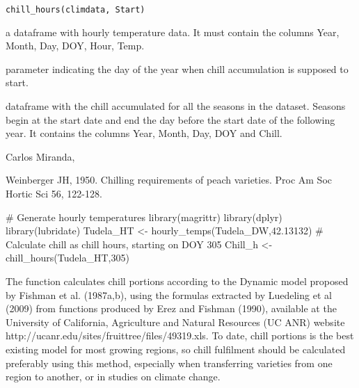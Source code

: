 \documentclass[a4paper]{book}
\begin{document}
%
\begin{Usage}
\begin{verbatim}
chill_hours(climdata, Start)
\end{verbatim}
\end{Usage}
%
\begin{Arguments}
\begin{ldescription}
\item[\code{climdata}] a dataframe with hourly temperature data. It
must contain the columns Year, Month, Day, DOY, Hour, Temp.

\item[\code{Start}] parameter indicating the day of the year when chill
accumulation is supposed to start.
\end{ldescription}
\end{Arguments}
%
\begin{Value}
dataframe with the chill accumulated for all the seasons in the
dataset. Seasons begin at the start date and end the day before the start
date of the following year. It contains the columns Year, Month, Day, 
DOY and Chill.
\end{Value}
%
\begin{Author}\relax
Carlos Miranda, 
\end{Author}
%
\begin{References}\relax
Weinberger JH, 1950. Chilling requirements of peach varieties. Proc Am Soc
Hortic Sci 56, 122-128.
\end{References}
%
\begin{Examples}
\begin{ExampleCode}

# Generate hourly temperatures
library(magrittr)
library(dplyr)
library(lubridate)
Tudela_HT <- hourly_temps(Tudela_DW,42.13132)
# Calculate chill as chill hours, starting on DOY 305
Chill_h <- chill_hours(Tudela_HT,305)

\end{ExampleCode}
\end{Examples}
%
\begin{Description}\relax
The function calculates chill portions according to the Dynamic model
proposed by Fishman et al. (1987a,b), using the formulas extracted by
Luedeling et al (2009) from functions produced by Erez and Fishman (1990), 
available at the University of California, Agriculture and Natural Resources
(UC ANR) website http://ucanr.edu/sites/fruittree/files/49319.xls. To date, 
chill portions is the best existing model for most growing regions, so chill
fulfilment should  be calculated preferably using this method, especially
when transferring varieties from one region to another, or in studies on 
climate change.
\end{Description}
\end{document}
